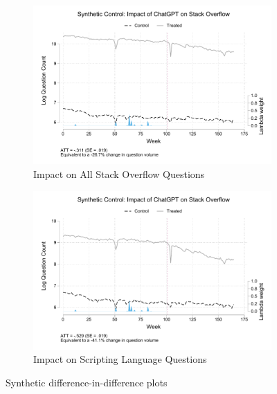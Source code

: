 \begin{figure}[H]
    \centering
    \begin{subfigure}[b]{0.475\textwidth}
        \centering
        \includegraphics[width=1\textwidth]{imgs/stata/sdid_all_trends101.pdf}
        \caption{Impact on All Stack Overflow Questions}
        \label{fig:sdid_all}
    \end{subfigure}
    \hfill
    \begin{subfigure}[b]{0.475\textwidth}
        \centering
        \includegraphics[width=1\textwidth]{imgs/stata/sdid_script_trends101.pdf}
        \caption{Impact on Scripting Language Questions}
        \label{fig:sdid_script}
    \end{subfigure}
    \caption{Synthetic difference-in-difference plots}
    \label{fig:DiD}
\end{figure}

